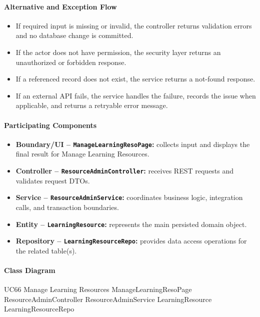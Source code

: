\paragraph{Alternative and Exception Flow}

\begin{itemize}
    \item If required input is missing or invalid, the controller returns validation errors and no database change is committed.
    \item If the actor does not have permission, the security layer returns an unauthorized or forbidden response.
    \item If a referenced record does not exist, the service returns a not-found response.
    \item If an external API fails, the service handles the failure, records the issue when applicable, and returns a retryable error message.
\end{itemize}

\paragraph{Participating Components}

\begin{itemize}
    \item \textbf{Boundary/UI -- \texttt{ManageLearningResoPage}:} collects input and displays the final result for Manage Learning Resources.
    \item \textbf{Controller -- \texttt{ResourceAdminController}:} receives REST requests and validates request DTOs.
    \item \textbf{Service -- \texttt{ResourceAdminService}:} coordinates business logic, integration calls, and transaction boundaries.
    \item \textbf{Entity -- \texttt{LearningResource}:} represents the main persisted domain object.
    \item \textbf{Repository -- \texttt{LearningResourceRepo}:} provides data access operations for the related table(s).
\end{itemize}

\paragraph{Class Diagram}

\ClassDiagram
{UC66 Manage Learning Resources}
{ManageLearningResoPage}
{ResourceAdminController}
{ResourceAdminService}
{LearningResource}
{LearningResourceRepo}

